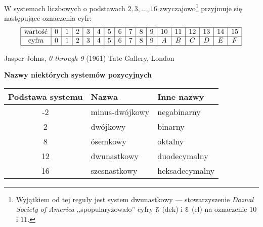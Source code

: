 \documentclass[a4paper,10pt]{beamer}
\begin{document}
\begin{frame}

	\begin{block}{}
		W systemach liczbowych o podstawach $2,3,\ldots,16$ zwyczajowo\footnote{Wyjątkiem od tej reguły jest system dwunastkowy --- stowarzyszenie {\it Doznal Society of America} ,,spopularyzowało'' cyfry $\rotatebox[origin=c]{180}{2}$ (dek) i $\reflectbox{3}$ (el) na oznaczenie $10$ i $11$.} przyjmuje się następujące oznaczenia cyfr:
		$$\begin{array}{|c|c|c|c|c|c|c|c|c|c|c|c|c|c|c|c|c|}\hline
		\mbox{wartość}&0&1&2&3&4&5&6&7&8&9&10&11&12&13&14&15\\\hline
		\mbox{cyfra}&0&1&2&3&4&5&6&7&8&9&A&B&C&D&E&F\\\hline
		\end{array}$$
	\end{block}
	


\begin{center}

 	Jasper Johns, {\it 0 through 9} (1961) \newline Tate Gallery, London
\end{center}

\end{frame}





\begin{frame}{\bf Nazwy niektórych systemów pozycyjnych}
	
	\begin{center}
		
	\begin{tabular}{|c|l|l|}\hline
		Podstawa systemu& Nazwa &Inne nazwy\\\hline
		-2&minus-dwójkowy&negabinarny\\\hline
		2& dwójkowy& binarny\\\hline
		8&ósemkowy&oktalny\\\hline
		12&dwunastkowy&duodecymalny\\\hline
		16& szesnastkowy&heksadecymalny\\\hline
	\end{tabular}

	\end{center}
	
\end{frame}
\end{document}
